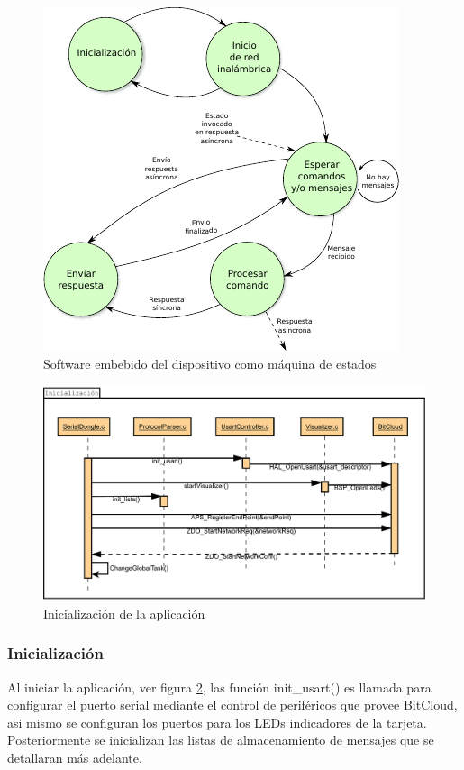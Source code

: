 \begin{figure}
	\centering
	\includegraphics[scale=1.2]{capitulo_3_imgs/app_sd.pdf}
	\caption{Software embebido del dispositivo como máquina de estados}
	\label{fig:maquina_estados_sd}
\end{figure}

\begin{figure}
	\centering
	\includegraphics[scale=0.35]{capitulo_3_imgs/Inicializacion.pdf}
	\caption{Inicialización de la aplicación}
	\label{fig:diagrama_inicializacion}
\end{figure}


\subsubsection{Inicialización}

Al iniciar la aplicación, ver figura \ref{fig:diagrama_inicializacion}, las función init\_usart() es llamada para configurar el puerto serial mediante el control de periféricos que provee BitCloud, asi mismo se configuran los puertos para los LEDs indicadores de la tarjeta. Posteriormente se inicializan las listas de almacenamiento de mensajes que se detallaran más adelante. 

